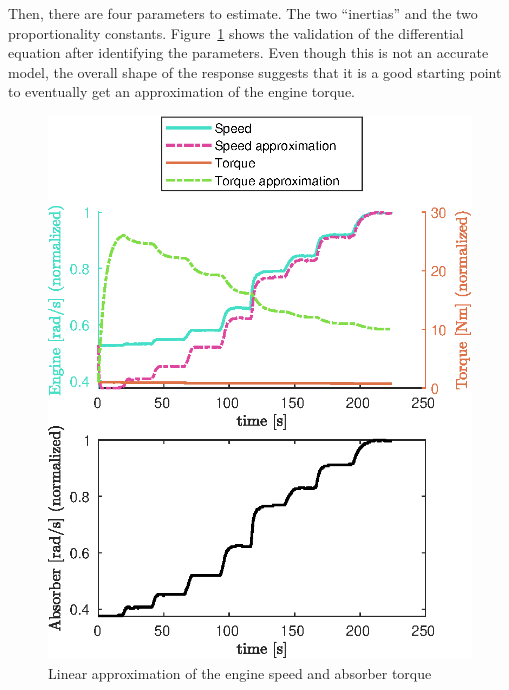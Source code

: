 \documentclass{article}
\begin{document}
Then, there are four parameters to estimate. The two ``inertias'' and the two proportionality constants. Figure~\ref{fig:linear_appx} shows the validation of the differential equation after identifying the parameters. Even though this is not an accurate model, the overall shape of the response suggests that it is a good starting point to eventually get an approximation of the engine torque.

\begin{figure}
\centering
\includegraphics[width=0.7\linewidth]{./figures/trad_appx_fig.eps}
\caption{Linear approximation of the engine speed and absorber torque}
\label{fig:linear_appx}
\end{figure}



\end{document}
